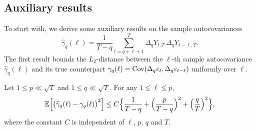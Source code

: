 \subsection*{Auxiliary results}


To start with, we derive some auxiliary results on the sample autocovariances 
\[ \widehat{\gamma}_q(\ell) = \frac{1}{T-q} \sum_{t=q+\ell+1}^T \Delta_q Y_{t,T} \, \Delta_q Y_{t-\ell,T}. \]
The first result bounds the $L_2$-distance between the $\ell$-th sample autocovariance $\widehat{\gamma}_q(\ell)$ and its true counterpart $\gamma_q(\ell) = \textnormal{Cov}(\Delta_q\varepsilon_t,\Delta_q\varepsilon_{t-\ell})$ uniformly over $\ell$. 
%
%
\begin{lemmaA}\label{lemma-lrv-1}
Let $1 \le p \ll \sqrt{T}$ and $1 \le q \ll \sqrt{T}$. For any $1 \le \ell \le p$,   
\[ \mathbb{E} \Big[ \big( \widehat{\gamma}_q(\ell) - \gamma_q(\ell) \big)^2 \Big] \le  C \Big\{ \frac{1}{T-q} + \Big(\frac{p}{T-q}\Big)^2 + \Big(\frac{q}{T}\Big)^2 \Big\}, \]
where the constant $C$ is independent of $\ell$, $p$, $q$ and $T$. 
\end{lemmaA}
%
%
